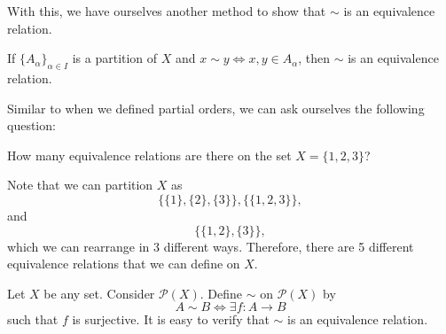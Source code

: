 \documentclass[notoc,notitlepage]{tufte-book}
\begin{document}
With this, we have ourselves another method to show that $\sim$ is an equivalence relation.

\begin{propo}
\label{propo:characterization_of_an_equivalence_relation}
  If $\{ A_\alpha \}_{\alpha \in I}$ is a partition of $X$ and $x \sim y \iff x, y \in A_{\alpha}$, then $\sim$ is an equivalence relation.
\end{propo}

Similar to when we defined partial orders, we can ask ourselves the following question:

\begin{eg}
  How many equivalence relations are there on the set $X = \{1, 2, 3\}$?

\end{eg}

\begin{solution}
  Note that we can partition $X$ as
  \begin{equation*}
    \{ \{1\}, \{2\}, \{3\} \}, \{ \{1, 2, 3\} \},
  \end{equation*}
  and
  \begin{equation*}
    \{ \{1, 2\}, \{3\} \},
  \end{equation*}
  which we can rearrange in 3 different ways. Therefore, there are 5 different equivalence relations that we can define on $X$.
\end{solution}

\begin{eg}\label{eg:same_cardinaliy}
  Let $X$ be any set. Consider $\mathcal{P}(X)$. Define $\sim$ on $\mathcal{P}(X)$ by
  \begin{equation*}
    A \sim B \iff \exists f: A \to B
  \end{equation*}
  such that $f$ is surjective. It is easy to verify that $\sim$ is an equivalence relation.
\end{eg}


\end{document}
